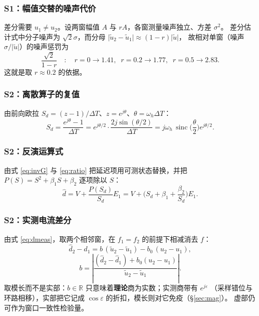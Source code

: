 \documentclass[11pt,a4paper]{ctexart}
\newcommand{\R}{\mathbb{R}}
\begin{document}
\subsubsection*{S1：幅值交替的噪声代价}

差分需要 $u_1\neq u_2$。设两窗幅值 $A$ 与 $rA$，各窗测量噪声独立、方差 $\sigma^2$。
差分估计式中分子噪声为 $\sqrt2\sigma$，而分母 $\lvert\tilde u_2-\tilde u_1\rvert\approx(1-r)\lvert\tilde u\rvert$，
故相对单窗（噪声 $\sigma/\lvert\tilde u\rvert$）的噪声惩罚为
\begin{equation}
\frac{\sqrt2}{1-r}\quad:\quad
r=0\to1.41,\;\;r=0.2\to1.77,\;\;r=0.5\to2.83 .
\label{eq:E4}
\end{equation}
这就是取 $r\approx0.2$ 的依据。

\subsubsection*{S2：离散算子的复值}

由前向欧拉 $S_d=(z-1)/\Delta T$、$z=e^{j\theta}$、$\theta=\omega_h\Delta T$：
\begin{equation}
S_d=\frac{e^{j\theta}-1}{\Delta T}
=e^{j\theta/2}\cdot\frac{2j\sin(\theta/2)}{\Delta T}
=j\omega_h\,\operatorname{sinc}\!\Big(\frac{\theta}{2}\Big)e^{j\theta/2}.
\label{eq:E5}
\end{equation}

\subsubsection*{S2：反演运算式}

由式 \eqref{eq:invG} 与 \eqref{eq:ratio} 把延迟项用可测状态替换，并把
$P(S)=S^2+\beta_1S+\beta_2$ 逐项除以 $S$：
\begin{equation}
\hat d=V+\frac{P(S_d)}{S_d}E_1
=V+\Big(S_d+\beta_1+\frac{\beta_2}{S_d}\Big)E_1 .
\label{eq:E6}
\end{equation}

\subsubsection*{S2：实测电流差分}

由式 \eqref{eq:dmeas}，取两个相邻窗，在 $f_1=f_2$ 的前提下相减消去 $f$：
\begin{equation}
\hat d_2-\hat d_1=b\,(\tilde u_2-\tilde u_1)-b_0\,(u_2-u_1),
\label{eq:E7}
\end{equation}
\begin{equation}
b=\left|\frac{(\hat d_2-\hat d_1)+b_0(u_2-u_1)}{\tilde u_2-\tilde u_1}\right|.
\label{eq:E8}
\end{equation}
取模长而不是实部：$b\in\R$ 只意味着\textbf{理论}商为实数；实测商带有 $e^{j\varepsilon}$
（采样错位与环路相移），实部把它记成 $\cos\varepsilon$ 的折扣，模长则对它免疫（\S\ref{sec:mag}）。
虚部仍可作为窗口一致性检验量。
\end{document}
